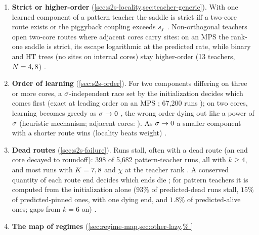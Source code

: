 \begin{enumerate}[label=\arabic*.,ref=\arabic*,leftmargin=*,itemsep=2pt]
    when the residual's ``piggyback'' coupling on small sets of cores stays below the learned weight
    $\tw j$, as for two-component teachers learned in weight order \proven; several learned components are
    not covered. From $k^*=5$ on it can be lower at a non-strict saddle: a three-component MPS6 teacher
    with $k^*=5$ has order $4$ \proven{} (gradient flow escapes in $\propto\isc^{-2}$, not $\isc^{-3}$, \derived).
    A pre-registered test (about 2{,}800 runs) finds the escape exponent of the lower order to three digits wherever the init scale lies below the predicted crossover, in five teacher--tree cases and from small initialization \empirical{} (not independently verified).
  \item\label{it:intro-strict} \textbf{Strict or higher-order}
    (\cref{sec:s2s-locality,sec:teacher-generic}). With one learned component of a pattern teacher the
    saddle is strict iff a two-core route exists or the piggyback coupling exceeds $\tw j$ \proven.
    Non-orthogonal teachers open two-core routes where adjacent cores carry sites: on an MPS the
    rank-one saddle is strict, its escape logarithmic at the predicted rate, while binary and HT trees (no
    sites on internal cores) stay higher-order (13 teachers, $N=4,8$) \derived{} \empirical.
  \item\label{it:intro-order} \textbf{Order of learning} (\cref{sec:s2s-order}). For
    two components differing on three or more cores, a $\sigma$-independent race set by the initialization
    decides which comes first (exact at leading order on an MPS \proven; 67,200 runs
    \empirical); on two cores, learning becomes greedy as $\sigma\to0$ \derived, the wrong order dying out like
    a power of $\sigma$ \empirical{} (heuristic mechanism; adjacent cores: \conjecture). As $\sigma\to0$ a smaller
    component with a shorter route wins (locality beats weight) \derived{} \empirical.
  \item\label{it:intro-failure} \textbf{Dead routes} (\cref{sec:s2s-failure}). Runs stall,
    often with a dead route (an end core decayed to roundoff): 398 of 5,682 pattern-teacher runs, all with
    $k\ge4$, and most runs with $K=7,8$ and $\chi$ at the teacher rank \empirical. A conserved quantity of
    each route end decides which ends die \derived; for pattern teachers it is computed from the
    initialization alone ($93\%$ of predicted-dead runs stall, $15\%$ of predicted-pinned ones, with one
    dying end, and $1.8\%$ of predicted-alive ones; gaps from $k=6$ on) \empirical.
  \item\label{it:intro-regimes} \textbf{The map of regimes} (\cref{sec:regime-map,sec:other-lazy,%
}
\end{enumerate}
